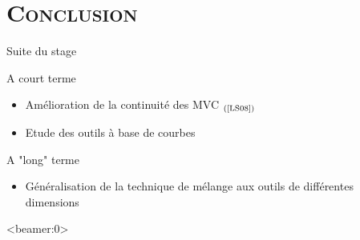\documentclass[xcolor=x11names,compress]{beamer}
\renewcommand{\(}{\begin{columns}} \renewcommand{\)}{\end{columns}}
\newcommand{\<}[1]{\begin{column}{#1}} \renewcommand{\>}{\end{column}}
\begin{document}
\section{\scshape Conclusion}
\begin{frame}{Suite du stage}
\begin{block}{A court terme}
\begin{itemize}
\item Amélioration de la continuité des MVC $_{(\text{\cite{LS08}})}$
\item Etude des outils à base de courbes
\end{itemize}
\end{block}
\begin{block}{A "long" terme}
\begin{itemize}
\item Généralisation de la technique de mélange aux outils de différentes dimensions
\end{itemize}
\end{block}
\end{frame}

\appendix

\begin{frame}<beamer:0>


\end{frame}
\end{document}
